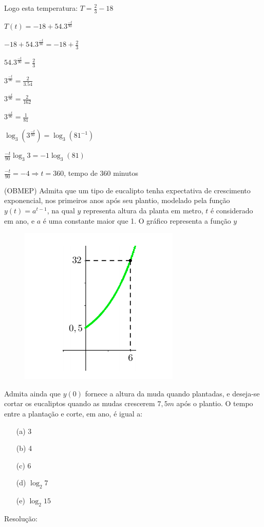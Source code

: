 \begin{multicols*}{2}
\begin{itemize}
            Logo esta temperatura: $T = \frac{2}{3} -18 $
            
            $T(t) = -18 + 54.3^{\frac{-t}{90}}$
            
            $-18 + 54.3^{\frac{-t}{90}} = -18 + \frac{2}{3}$
            
            $ 54.3^{\frac{-t}{90}} = \frac{2}{3}$
            
            $3^{\frac{-t}{90}} = \frac{2}{3.54}$
            
            $3^{\frac{-t}{90}} = \frac{2}{162}$
            
            $3^{\frac{-t}{90}} = \frac{1}{81}$
            
            $ \log_3 \left( 3^{\frac{-t}{90}} \right) = \log_3 \left(81^{-1} \right)$
            
            $\frac{-t}{90} \log_3 3 = -1 \log_3 (81)$		
            
            $\frac{-t}{90} = -4 \Rightarrow t = 360$, tempo de 360 minutos
            \end{itemize}
            
            (OBMEP) Admita que um tipo de eucalipto tenha expectativa de crescimento exponencial, nos 				primeiros anos após seu plantio, modelado pela função $y(t) = a^{t-1}$, na qual $y$ representa  		altura da planta em metro, $t$ é considerado em ano, e $a$  é uma constante maior que 1. O 				gráfico representa a função $y$
            
            \begin{figure}[H]
                \includegraphics[scale=0.4]{assets/rafael/img23.png}
            \end{figure}		
            Admita ainda que $y(0)$ fornece a altura da muda quando plantadas, e deseja-se cortar os 				eucaliptos quando as mudas crescerem $7,5m$ após o plantio. O tempo entre a plantação e corte, 			em ano, é igual a:
            \begin{itemize}
            \item[(a)] 3
            \item[(b)] 4	
            \item[(c)] 6
            \item[(d)] $\log_2 7$
            \item[(e)] $\log_2 15$
            \end{itemize}
            Resolução:
            

\end{multicols*}
